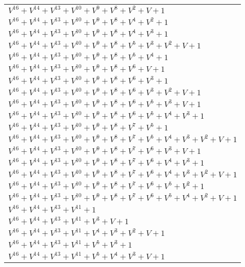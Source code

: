 \documentclass[12pt]{article}
\begin{document}
\begin{adjustwidth}{-4cm}{}
\begin{center}
\begin{longtable}{|l|}
$V^{16}  +V^{14}  +V^{13}  +V^{10}  +V^{9}  +V^{8}  +V^{2}  + V + 1$ \\
$V^{16}  +V^{14}  +V^{13}  +V^{10}  +V^{9}  +V^{8}  +V^{4}  +V^{2}  + 1$ \\
$V^{16}  +V^{14}  +V^{13}  +V^{10}  +V^{9}  +V^{8}  +V^{4}  +V^{3}  + 1$ \\
$V^{16}  +V^{14}  +V^{13}  +V^{10}  +V^{9}  +V^{8}  +V^{5}  +V^{3}  +V^{2}  + V + 1$ \\
$V^{16}  +V^{14}  +V^{13}  +V^{10}  +V^{9}  +V^{8}  +V^{5}  +V^{4}  + 1$ \\
$V^{16}  +V^{14}  +V^{13}  +V^{10}  +V^{9}  +V^{8}  +V^{6}  + V + 1$ \\
$V^{16}  +V^{14}  +V^{13}  +V^{10}  +V^{9}  +V^{8}  +V^{6}  +V^{3}  + 1$ \\
$V^{16}  +V^{14}  +V^{13}  +V^{10}  +V^{9}  +V^{8}  +V^{6}  +V^{3}  +V^{2}  + V + 1$ \\
$V^{16}  +V^{14}  +V^{13}  +V^{10}  +V^{9}  +V^{8}  +V^{6}  +V^{5}  +V^{3}  + V + 1$ \\
$V^{16}  +V^{14}  +V^{13}  +V^{10}  +V^{9}  +V^{8}  +V^{6}  +V^{5}  +V^{4}  +V^{3}  + 1$ \\
$V^{16}  +V^{14}  +V^{13}  +V^{10}  +V^{9}  +V^{8}  +V^{7}  +V^{5}  + 1$ \\
$V^{16}  +V^{14}  +V^{13}  +V^{10}  +V^{9}  +V^{8}  +V^{7}  +V^{5}  +V^{4}  +V^{3}  +V^{2}  + V + 1$ \\
$V^{16}  +V^{14}  +V^{13}  +V^{10}  +V^{9}  +V^{8}  +V^{7}  +V^{6}  +V^{3}  + V + 1$ \\
$V^{16}  +V^{14}  +V^{13}  +V^{10}  +V^{9}  +V^{8}  +V^{7}  +V^{6}  +V^{4}  +V^{3}  + 1$ \\
$V^{16}  +V^{14}  +V^{13}  +V^{10}  +V^{9}  +V^{8}  +V^{7}  +V^{6}  +V^{4}  +V^{3}  +V^{2}  + V + 1$ \\
$V^{16}  +V^{14}  +V^{13}  +V^{10}  +V^{9}  +V^{8}  +V^{7}  +V^{6}  +V^{5}  +V^{2}  + 1$ \\
$V^{16}  +V^{14}  +V^{13}  +V^{10}  +V^{9}  +V^{8}  +V^{7}  +V^{6}  +V^{5}  +V^{4}  +V^{2}  + V + 1$ \\
$V^{16}  +V^{14}  +V^{13}  +V^{11}  + 1$ \\
$V^{16}  +V^{14}  +V^{13}  +V^{11}  +V^{3}  + V + 1$ \\
$V^{16}  +V^{14}  +V^{13}  +V^{11}  +V^{4}  +V^{3}  +V^{2}  + V + 1$ \\
$V^{16}  +V^{14}  +V^{13}  +V^{11}  +V^{5}  +V^{3}  + 1$ \\
$V^{16}  +V^{14}  +V^{13}  +V^{11}  +V^{5}  +V^{4}  +V^{3}  + V + 1$ \\

\end{longtable}
\end{center}
\end{adjustwidth}
\end{document}
